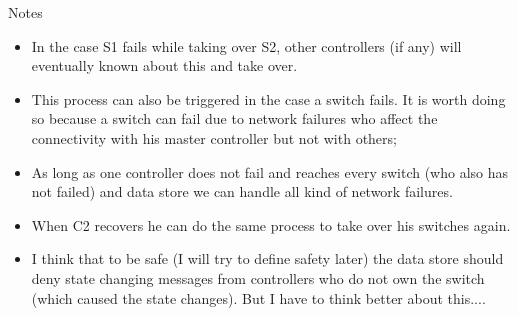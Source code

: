 \documentclass[12pt,openright,twoside]{report}
\begin{document}
Notes
\begin{itemize}
\item In the case S1 fails while taking over S2, other controllers (if any) will eventually known about this and take over. 
\item This process can also be triggered in the case a switch fails. It is worth doing so because a switch can fail due to network failures who affect the connectivity with his master controller but not with others; 
\item As long as one  controller does not fail and reaches every switch (who also has not failed)  and data store we can handle all kind of network failures.
\item When C2 recovers he can do the same process to take over his switches again. 
\item I think that to be safe (I will try to define safety later) the data store should deny state changing messages from controllers who do not own the switch (which caused the state changes). But I have to think better about this.... 
\end{itemize}





\end{document}
